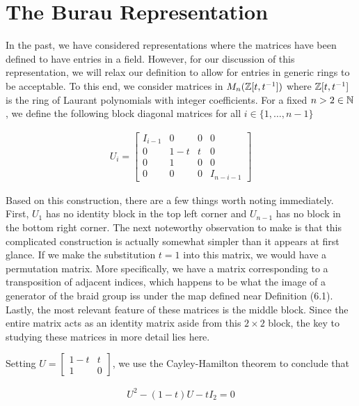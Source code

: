 \section{The Burau Representation}


In the past, we have considered representations where the matrices have been defined to have entries in a field. However, for our discussion of this representation, we will relax our definition to allow for entries in generic rings to be acceptable. To this end, we consider matrices in $M_n(\mathbb{Z}[t,t^{-1}])$ where $\mathbb{Z}[t,t^{-1}]$ is the ring of Laurant polynomials with integer coefficients. For a fixed $n>2\in\mathbb{N}$, we define the following block diagonal matrices for all $i\in \{1,\hdots,n-1\}$

\begin{equation}
\begin{aligned}
U_i = \begin{bmatrix}
			I_{i-1}& 0 & 0 & 0 \\
			0 & 1-t & t & 0\\
			0 & 1 & 0 & 0\\
			0 & 0 & 0 & I_{n-i-1}
		\end{bmatrix}
\end{aligned}
\end{equation}

Based on this construction, there are a few things worth noting immediately. First, $U_1$ has no identity block in the top left corner and $U_{n-1}$ has no block in the bottom right corner. The next noteworthy observation to make is that this complicated construction is actually somewhat simpler than it appears at first glance. If we make the substitution $t=1$ into this matrix, we would have a permutation matrix. More specifically, we have a matrix corresponding to a transposition of adjacent indices, which happens to be what the image of a generator of the braid group iss under the map defined near Definition (6.1). Lastly, the most relevant feature of these matrices is the middle block. Since the entire matrix acts as an identity matrix aside from this $2\times 2$ block, the key to studying these matrices in more detail lies here.

Setting $U= \begin{bmatrix} 1-t & t\\1 & 0 \end{bmatrix}$, we use the Cayley-Hamilton theorem to conclude that

\begin{equation}
\begin{aligned}
	U^2 - (1-t)U - tI_2 = 0
\end{aligned}
\end{equation}

